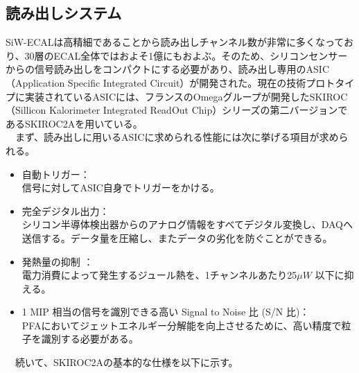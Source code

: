 \subsection{読み出しシステム}
 SiW-ECALは高精細であることから読み出しチャンネル数が非常に多くなっており、30層のECAL全体ではおよそ1億にもおよぶ。そのため、シリコンセンサーからの信号読み出しをコンパクトにする必要があり、読み出し専用のASIC（Application Specific Integrated Circuit）が開発された。現在の技術プロトタイプに実装されているASICには、フランスのOmegaグループが開発したSKIROC（Sillicon Kalorimeter Integrated ReadOut Chip）シリーズの第二バージョンであるSKIROC2Aを用いている。\\
　まず、読み出しに用いるASICに求められる性能には次に挙げる項目が求められる。
 \begin{itemize}
	\item 自動トリガー：\\
		信号に対してASIC自身でトリガーをかける。
	\item 完全デジタル出力：\\
		 シリコン半導体検出器からのアナログ情報をすべてデジタル変換し、DAQへ送信する。データ量を圧縮し、またデータの劣化を防ぐことができる。
	\item 発熱量の抑制 ：\\
		電力消費によって発生するジュール熱を、1チャンネルあたり25$\mu W$ 以下に抑える。
	\item 1 MIP 相当の信号を識別できる高い Signal to Noise 比 (S/N 比)：\\
		PFAにおいてジェットエネルギー分解能を向上させるために、高い精度で粒子を識別する必要がある。
 \end{itemize}
　続いて、SKIROC2Aの基本的な仕様を以下に示す。
